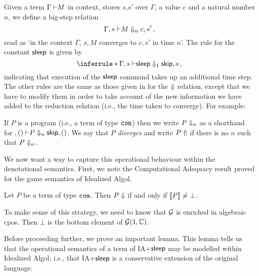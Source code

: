 \documentclass{article}
\begin{document}
Given a term $\Gamma{\;\vdash} M$ in context, stores $s$,$s'$ over $\Gamma$, a value $c$ and a natural number $n$, we define a big-step relation
\[
  \Gamma,s{\;\vdash} M\Downarrow_n c,s'\,,
  \]
read as `in the context $\Gamma$, $s,M$ converges to $c,s'$ in time $n$'.  
The rule for the constant ${\mathsf{sleep}}$ is given by
\[
  \inferrule*
  { }
  {\Gamma,s\ts \sleep\converges_1 \skipp,s}\,,
  \]
indicating that execution of the ${\mathsf{sleep}}$ command takes up an additional time step.  
The other rules are the same as those given in \cite{SamsonGuyIAActive} for the $\Downarrow$ relation, except that we have to modify them in order to take account of the new information we have added to the reduction relation (i.e., the time taken to converge).
For example:
If $P$ is a program (i.e., a term of type ${\mathtt{com}}$) then we write $P\Downarrow_n$ as a shorthand for $,(){\;\vdash} P \Downarrow_n {\mathsf{skip}},()$.
We say that $P$ \emph{diverges} and write $P\Uparrow$ if there is no $n$ such that $P\Downarrow_n$.

We now want a way to capture this operational behaviour within the denotational semantics.
First, we note the Computational Adequacy result proved for the game semantics of Idealized Algol.

\begin{proposition}
  Let $P$ be a term of type ${\mathtt{com}}$.  
  Then $P\Downarrow$ if and only if $\left\llbracket P\right\rrbracket\ne\bot$.
  \label{SamsonGuyAdequacy}
\end{proposition}

To make sense of this strategy, we need to know that $\mathcal G$ is enriched in algebraic cpos.  
Then $\bot$ is the bottom element of $\mathcal G(1,\mathbb{C})$.

Before proceeding further, we prove an important lemma.  
This lemma tells us that the operational semantics of a term of IA+${\mathsf{sleep}}$ may be modelled within Idealized Algol; i.e., that IA+${\mathsf{sleep}}$ is a conservative extension of the original language.
\end{document}
